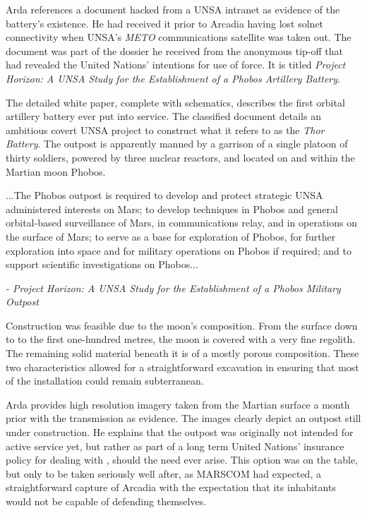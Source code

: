 Arda references a document hacked from a UNSA intranet as evidence of the battery's existence. He had received it prior to Arcadia having lost solnet connectivity when UNSA's {\it METO} communications satellite was taken out. The document was part of the dossier he received from the anonymous tip-off that had revealed the United Nations' intentions for use of force. It is titled {\it Project Horizon: A UNSA Study for the Establishment of a Phobos Artillery Battery}.

The detailed white paper, complete with schematics, describes the first orbital artillery battery ever put into service. The classified document details an ambitious covert UNSA project to construct what it refers to as the {\it Thor Battery}. The outpost is apparently manned by a garrison of a single platoon of thirty soldiers, powered by three nuclear reactors, and located on and within the Martian moon Phobos. 

\startTimelineGeneralDocument
...The Phobos outpost is required to develop and protect strategic UNSA administered interests on Mars; to develop techniques in Phobos and general orbital-based surveillance of Mars, in communications relay, and in operations on the surface of Mars; to serve as a base for exploration of Phobos, for further exploration into space and for military operations on Phobos if required; and to support scientific investigations on Phobos...

\hskip 1.5cm {\it - Project Horizon: A UNSA Study for the Establishment of a Phobos Military Outpost}
\stopTimelineGeneralDocument

Construction was feasible due to the moon's composition. From the surface down to to the first one-hundred metres, the moon is covered with a very fine regolith. The remaining solid material beneath it is of a mostly porous composition. These two characteristics allowed for a straightforward excavation in ensuring that most of the installation could remain subterranean.

Arda provides high resolution imagery taken from the Martian surface a month prior with the transmission as evidence. The images clearly depict an outpost still under construction. He explains that the outpost was originally not intended for active service yet, but rather as part of a long term United Nations' insurance policy for dealing with , should the need ever arise. This option was on the table, but only to be taken seriously well after, as MARSCOM had expected, a straightforward capture of Arcadia with the expectation that its inhabitants would not be capable of defending themselves.

